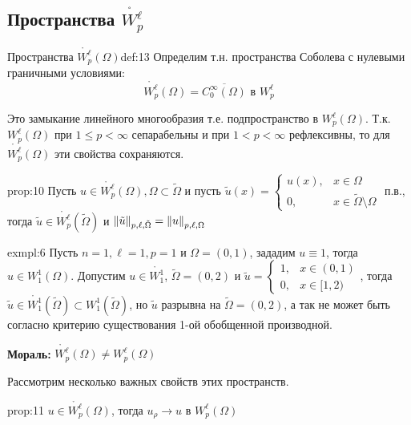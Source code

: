 \documentclass[12pt,a4paper]{article}
\begin{document}
\subsection{Пространства $\mathring{W_p^\ell}$}

\begin{definition}{Пространства $\mathring{W_p^\ell} (\Omega)$}{def:13}
	Определим т.н. пространства Соболева с нулевыми граничными условиями:
	\begin{equation*}
		\mathring{W_p^\ell} (\Omega) = \overline{C_0^\infty (\Omega)} \text{ в } W_p^\ell
	\end{equation*}
\end{definition}
Это замыкание линейного многообразия т.е. подпространство в $W_p^\ell (\Omega)$. Т.к. $W_p^\ell (\Omega)$ при $1 \leq p < \infty$ сепарабельны и при $1 < p < \infty$ рефлексивны, то для $\mathring{W_p^\ell} (\Omega)$ эти свойства сохраняются.

\begin{proposition}{}{prop:10}
	Пусть $u \in \mathring{W_p^\ell} (\Omega), \Omega \subset \tilde{\Omega}$ и пусть
	$\tilde{u} (x) = 
		\begin{cases}
			u(x), &x \in \Omega \\
			0, &x \in \tilde{\Omega} \setminus \Omega
	 	\end{cases}$ п.в., тогда $\tilde{u} \in \mathring{W_p^\ell} (\tilde{\Omega})$ и $\norm{\tilde{u}}_{p, \ell, \tilde{\Omega}} = \norm{u}_{p, \ell, \Omega}$
\end{proposition}

\begin{example}{}{exmpl:6}
	Пусть $n = 1, \ell = 1, p = 1$ и $\Omega = (0, 1)$, зададим $u \equiv 1$, тогда $u \in W_1^1 (\Omega)$. Допустим $u \in \mathring{W_1^1}$, $\tilde{\Omega} = (0, 2)$ и 
	$\tilde{u} = 
		\begin{cases}
			1, &x \in (0, 1) \\
			0, &x \in [1, 2)
		\end{cases}$, тогда \\ $\tilde{u} \in \mathring{W_1^1} (\tilde{\Omega}) \subset W_1^1 (\tilde{\Omega})$, но $\tilde{u}$ разрывна на $\tilde{\Omega} = (0, 2)$, а так не может быть согласно критерию существования 1-ой обобщенной производной.
\end{example}
\textbf{Мораль:} $\mathring{W_p^\ell} (\Omega) \neq W_p^\ell (\Omega)$

Рассмотрим несколько важных свойств этих пространств.
\begin{proposition}{}{prop:11}
	$u \in \mathring{W_p^\ell} (\Omega)$, тогда $u_\rho \to u$ в $W_p^\ell (\Omega)$
\end{proposition}
\end{document}
